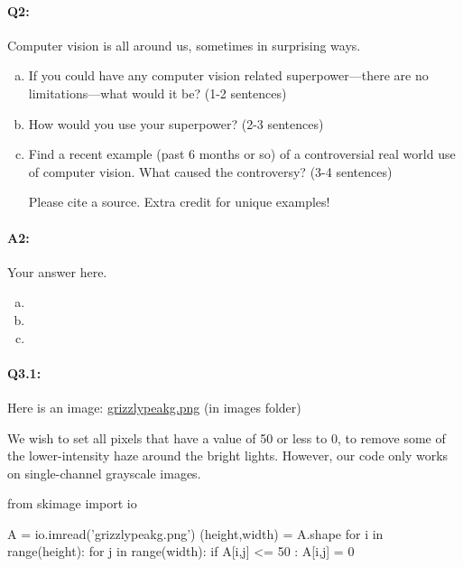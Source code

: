 \documentclass[11pt]{article}
\begin{document}
\paragraph{Q2:}
Computer vision is all around us, sometimes in surprising ways.
\begin{enumerate}[(a)]

\item
If you could have any computer vision related superpower---there are no limitations---what would it be? (1-2 sentences)

\item
How would you use your superpower? (2-3 sentences)

\item Find a recent example (past 6 months or so) of a controversial real world use of computer vision. What caused the controversy? (3-4 sentences)

Please cite a source. Extra credit for unique examples!
\end{enumerate}

\paragraph{A2:} Your answer here.

\begin{enumerate}[(a)]

\item

\item

\item

\end{enumerate}



\pagebreak
\paragraph{Q3.1:} Here is an image: \href{images/grizzlypeakg.png}{grizzlypeakg.png} (in images folder)

We wish to set all pixels that have a value of 50 or less to 0, to remove some of the lower-intensity haze around the bright lights. However, our code only works on single-channel grayscale images.

\begin{python}
from skimage import io

A = io.imread('grizzlypeakg.png')
(height,width) = A.shape
for i in range(height):
    for j in range(width):
        if A[i,j] <= 50 :
            A[i,j] = 0
\end{python}
\end{document}
